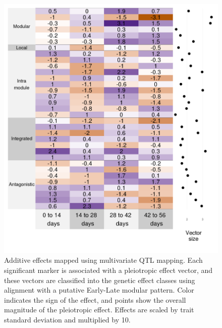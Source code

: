 \begin{refsection}
\begin{figure}
    \centering
    \includegraphics[width=\linewidth]{chapter_atchley/media/additive_effects_points.png}
    \caption[QTL effect classification]{Additive effects mapped using multivariate QTL mapping. 
    Each significant marker is associated with a pleiotropic effect vector, and these vectors 
    are classified into the genetic effect classes using alignment with a putative Early-Late 
    modular pattern. Color indicates the sign of the effect, and points show the overall magnitude 
    of the pleiotropic effect. Effects are scaled by trait standard deviation and multiplied by 10.}
    \label{additive_effects_vectors}
\end{figure}


\end{refsection}
